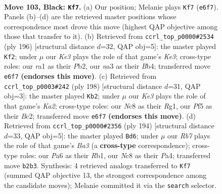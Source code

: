 \documentclass[11pt]{article}
\begin{document}
\clearpage

\begin{figure}[p]\centering
\begin{subfigure}{0.46\textwidth}\centering
\resizebox{\linewidth}{!}{%
\newchessgame
\chessboard[
  setfen={2n4K/8/p3k3/P4p1p/5B2/N5P1/1r4b1/R7 b - - 17 103},
  showmover=false,
  pgfstyle=straightmove, color=movearrow, markmove={e6-f7}
]}
\caption{}
\end{subfigure}\hfill
\begin{subfigure}{0.46\textwidth}\centering
\resizebox{\linewidth}{!}{%
\newchessgame
\chessboard[
  setfen={2k5/8/p1p1n1p1/8/PB2P1pP/4K3/1P6/8 w - - 0 99},
  showmover=false,
  pgfstyle=straightmove, color=movearrow, markmove={e3-f2}
]}
\caption{}
\end{subfigure}
\\[4pt]
\begin{subfigure}{0.46\textwidth}\centering
\resizebox{\linewidth}{!}{%
\newchessgame
\chessboard[
  setfen={7k/r2b4/8/2pNP1b1/2P4p/2P5/K1B5/6R1 w - - 9 100},
  showmover=false,
  pgfstyle=straightmove, color=movearrow, markmove={a2-b2}
]}
\caption{}
\end{subfigure}\hfill
\begin{subfigure}{0.46\textwidth}\centering
\resizebox{\linewidth}{!}{%
\newchessgame
\chessboard[
  setfen={8/1p6/2b1pb2/p6k/P4P2/B5K1/8/1R6 w - - 0 98},
  showmover=false,
  pgfstyle=straightmove, color=movearrow, markmove={a3-d6}
]}
\caption{}
\end{subfigure}
\caption{\textbf{Move 103, Black: \texttt{Kf7}.} (a) Our position; Melanie plays \texttt{Kf7} (\texttt{e6f7}). Panels (b)--(d) are the retrieved master positions whose correspondence most drove this move (highest QAP objective among those that transfer to it). (b) Retrieved from \texttt{ccrl\_top\_p0000\#2534} (ply 196) [structural distance $d$=32, QAP obj=5]: the master played \texttt{Kf2}; under $\mu$ our \emph{Ke3} plays the role of that game's \emph{Ke3}; cross-type roles: our \emph{r}a1 as their \emph{P}b2, our \emph{n}a3 as their \emph{B}b4; transferred move \texttt{e6f7} \textbf{(endorses this move)}. (c) Retrieved from \texttt{ccrl\_top\_p0003\#242} (ply 198) [structural distance $d$=31, QAP obj=3]: the master played \texttt{Kb2}; under $\mu$ our \emph{Ke3} plays the role of that game's \emph{Ka2}; cross-type roles: our \emph{N}c8 as their \emph{R}g1, our \emph{P}f5 as their \emph{B}c2; transferred move \texttt{e6f7} \textbf{(endorses this move)}. (d) Retrieved from \texttt{ccrl\_top\_p0000\#2356} (ply 194) [structural distance $d$=33, QAP obj=5]: the master played \texttt{Bd6}; under $\mu$ our \emph{Rb7} plays the role of that game's \emph{Ba3} (a \textbf{cross-type} correspondence); cross-type roles: our \emph{P}a6 as their \emph{R}b1, our \emph{N}c8 as their \emph{P}a4; transferred move \texttt{b2b3}. Synthesis: 4 retrieved analogs transferred to \texttt{Kf7} (summed QAP objective 13, the strongest correspondence among the candidate moves); Melanie committed it via the \texttt{search} selector.}
\label{fig:thought-m205}
\end{figure}
\end{document}
